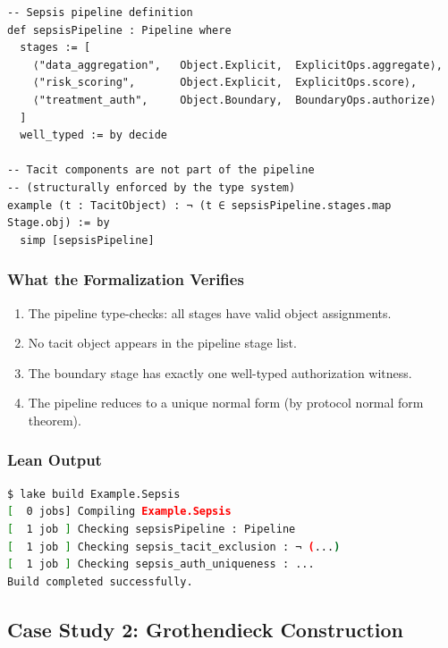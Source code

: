 \begin{lstlisting}
-- Sepsis pipeline definition
def sepsisPipeline : Pipeline where
  stages := [
    ⟨"data_aggregation",   Object.Explicit,  ExplicitOps.aggregate⟩,
    ⟨"risk_scoring",       Object.Explicit,  ExplicitOps.score⟩,
    ⟨"treatment_auth",     Object.Boundary,  BoundaryOps.authorize⟩
  ]
  well_typed := by decide

-- Tacit components are not part of the pipeline
-- (structurally enforced by the type system)
example (t : TacitObject) : ¬ (t ∈ sepsisPipeline.stages.map Stage.obj) := by
  simp [sepsisPipeline]
\end{lstlisting}

\subsubsection*{What the Formalization Verifies}

\begin{enumerate}
  \item The pipeline type-checks: all stages have valid object assignments.
  \item No tacit object appears in the pipeline stage list.
  \item The boundary stage has exactly one well-typed authorization witness.
  \item The pipeline reduces to a unique normal form (by protocol normal form
        theorem).
\end{enumerate}

\subsubsection*{Lean Output}

\begin{lstlisting}[language=bash]
$ lake build Example.Sepsis
[  0 jobs] Compiling Example.Sepsis
[  1 job ] Checking sepsisPipeline : Pipeline
[  1 job ] Checking sepsis_tacit_exclusion : ¬ (...)
[  1 job ] Checking sepsis_auth_uniqueness : ...
Build completed successfully.
\end{lstlisting}

\subsection{Case Study 2: Grothendieck Construction}

